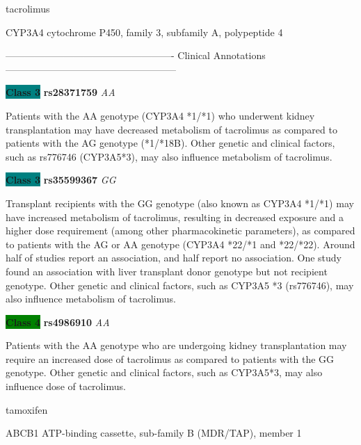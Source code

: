 \documentclass{resume} %
\begin{document}
\begin{rSection}{ tacrolimus }
\begin{rSubsection}{ CYP3A4 }{ cytochrome P450, family 3, subfamily A, polypeptide 4 }{}{}
\item[] ---------------------------------------------------- Clinical Annotations -----------------------------------------------------\newline
\item \textbf{\colorbox{teal} {Class 3}} \textbf{ rs28371759 } \textit{ AA }
\item[] Patients with the AA genotype (CYP3A4 *1/*1) who underwent kidney transplantation may have decreased metabolism of tacrolimus as compared to patients with the AG genotype (*1/*18B). Other genetic and clinical factors, such as rs776746 (CYP3A5*3), may also influence metabolism of tacrolimus.\item \textbf{\colorbox{teal} {Class 3}} \textbf{ rs35599367 } \textit{ GG }
\item[] Transplant recipients with the GG genotype (also known as CYP3A4 *1/*1) may have increased metabolism of tacrolimus, resulting in decreased exposure and a higher dose requirement (among other pharmacokinetic parameters), as compared to patients with the AG or AA genotype (CYP3A4 *22/*1 and *22/*22). Around half of studies report an association, and half report no association. One study found an association with liver transplant donor genotype but not recipient genotype. Other genetic and clinical factors, such as CYP3A5 *3 (rs776746), may also influence metabolism of tacrolimus.\item \textbf{\colorbox{green} {Class 4}} \textbf{ rs4986910 } \textit{ AA }
\item[] Patients with the AA genotype who are undergoing kidney transplantation may require an increased dose of tacrolimus as compared to patients with the GG genotype. Other genetic and clinical factors, such as CYP3A5*3, may also influence dose of tacrolimus.
\end{rSubsection}

\end{rSection}\begin{rSection}{ tamoxifen }
\item[]

\begin{rSubsection}{ ABCB1 }{ ATP-binding cassette, sub-family B (MDR/TAP), member 1 }{}{}
\item[]


\end{rSubsection}
\end{rSection}
\end{document}
